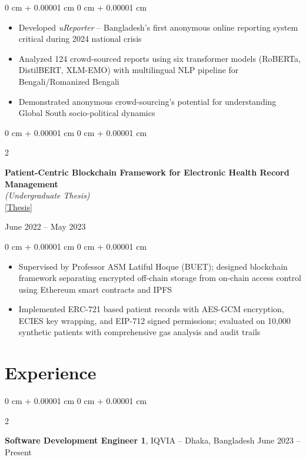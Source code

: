 \documentclass[10pt, letterpaper]{article}
\newenvironment{highlights}{
    \begin{itemize}[
        topsep=0.10 cm,
        parsep=0.10 cm,
        partopsep=0pt,
        itemsep=0pt,
        leftmargin=0 cm + 10pt
    ]
}{
    \end{itemize}
} %
\newenvironment{onecolentry}{
    \begin{adjustwidth}{
        0 cm + 0.00001 cm
    }{
        0 cm + 0.00001 cm
    }
}{
    \end{adjustwidth}
} %
\newenvironment{twocolentry}[2][]{
    \onecolentry
    \def\secondColumn{#2}
    \setcolumnwidth{\fill, 4.5 cm}
    \begin{paracol}{2}
}{
    \switchcolumn \raggedleft \secondColumn
    \end{paracol}
    \endonecolentry
} %
\begin{document}
\begin{onecolentry}
    \begin{highlights}
        \item Developed \textit{uReporter} -- Bangladesh's first anonymous online reporting system critical during 2024 national crisis
        \item Analyzed 124 crowd-sourced reports using six transformer models (RoBERTa, DistilBERT, XLM-EMO) with multilingual NLP pipeline for Bengali/Romanized Bengali
        \item Demonstrated anonymous crowd-sourcing's potential for understanding Global South socio-political dynamics
    \end{highlights}
\end{onecolentry}

\begin{twocolentry}{
    {June 2022 – May 2023}
}
    \textbf{Patient-Centric Blockchain Framework for Electronic Health Record Management} \\
    \textit{(Undergraduate Thesis)} \\
    \href{BLOCKCHAIN_HEALTH_LINK_PLACEHOLDER}{[Thesis]}
\end{twocolentry}

\begin{onecolentry}
    \begin{highlights}
        \item Supervised by Professor ASM Latiful Hoque (BUET); designed blockchain framework separating encrypted off-chain storage from on-chain access control using Ethereum smart contracts and IPFS
        \item Implemented ERC-721 based patient records with AES-GCM encryption, ECIES key wrapping, and EIP-712 signed permissions; evaluated on 10,000 synthetic patients with comprehensive gas analysis and audit trails
    \end{highlights}
\end{onecolentry}
    
    \section{Experience}
        
        \begin{twocolentry}{
            June 2023 – Present
        }
            \textbf{Software Development Engineer 1}, IQVIA -- Dhaka, Bangladesh\end{twocolentry}
\end{document}
